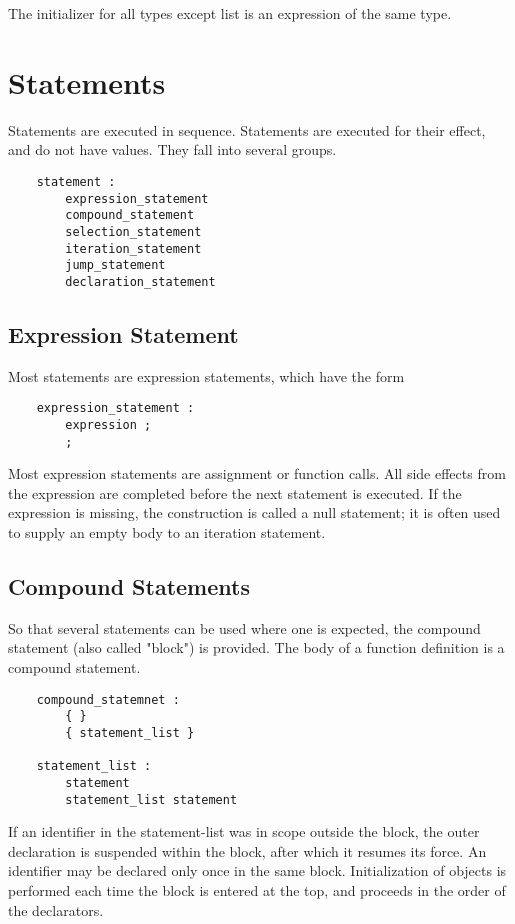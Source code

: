 \documentclass[letterpaper,12pt]{article}
\begin{document}
The initializer for all types except list is an expression of the same type. 



\section{Statements}
Statements are executed in sequence. Statements are executed for their effect, and do not have values. They fall into several groups.
\begin{lstlisting}
	statement :
		expression_statement
		compound_statement
		selection_statement
		iteration_statement
		jump_statement
		declaration_statement
\end{lstlisting}

\subsection{Expression Statement}
Most statements are expression statements, which have the form
\begin{lstlisting}
	expression_statement :
		expression ;
		;
\end{lstlisting}
Most expression statements are assignment or function calls. All side effects from the expression are completed before the next statement is executed. If the expression is missing, the construction is called a null statement; it is often used to supply an empty body to an iteration statement.

\subsection{Compound Statements}
So that several statements can be used where one is expected, the compound statement (also called "block") is provided. The body of a function definition is a compound statement.
\begin{lstlisting}
	compound_statemnet :
		{ }
		{ statement_list }

	statement_list :
		statement
		statement_list statement
\end{lstlisting}
If an identifier in the statement-list was in scope outside the block, the outer declaration is suspended within the block, after which it resumes its force. An identifier may be declared only once in the same block. Initialization of objects is performed each time the block is entered at the top, and proceeds in the order of the declarators.
\end{document}
